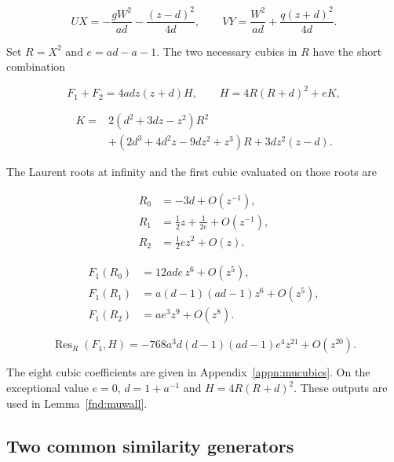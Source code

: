 \begin{equation}\label{supp:fnd:muuv}
UX=-\frac{gW^2}{ad}-\frac{(z-d)^2}{4d},\qquad
VY=\frac{W^2}{ad}+\frac{q(z+d)^2}{4d}.
\end{equation}

Set $R=X^2$ and $e=ad-a-1$. The two necessary cubics in $R$
have the short combination

\begin{equation}\label{supp:fnd:mu-short-cubic}
 F_1+F_2=4adz(z+d)H,
 \qquad H=4R(R+d)^2+eK,
\end{equation}

\[
 \begin{aligned}
 K={}&2(d^2+3dz-z^2)R^2\\
 &+(2d^3+4d^2z-9dz^2+z^3)R
       +3dz^2(z-d).
 \end{aligned}
\]

The Laurent roots at infinity and the first cubic evaluated on
those roots are

\begin{equation}\label{supp:fnd:mu-newton-roots}
 \begin{aligned}
 R_0&=-3d+O(z^{-1}),\\
 R_1&=\tfrac12z+\tfrac1{2e}+O(z^{-1}),\\
 R_2&=\tfrac12ez^2+O(z).
 \end{aligned}
\end{equation}

\begin{equation}\label{supp:fnd:mu-newton-values}
 \begin{aligned}
 F_1(R_0)&=12ade\,z^6+O(z^5),\\
 F_1(R_1)&=a(d-1)(ad-1)z^6+O(z^5),\\
 F_1(R_2)&=ae^3z^9+O(z^8).
 \end{aligned}
\end{equation}

\begin{equation}\label{supp:fnd:mu-short-resultant}
 \operatorname{Res}_R(F_1,H)
 =-768a^3d(d-1)(ad-1)e^4z^{21}+O(z^{20}).
\end{equation}

The eight cubic coefficients are given in
Appendix~\ref{appn:mucubics}. On the exceptional value $e=0$,
$d=1+a^{-1}$ and $H=4R(R+d)^2$. These outputs are used in
Lemma~\ref{fnd:muwall}.

\subsection{Two common similarity generators}

